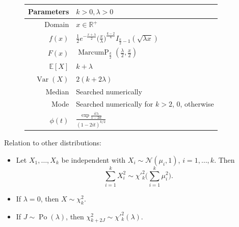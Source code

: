 \documentclass[a4paper,11pt]{article}
\theoremstyle{plain}
\theoremstyle{definition}
\newcommand{\ME}{\mathbb{E}}
\newcommand{\MR}{\mathbb{R}}
\newcommand{\Var}{\operatorname{Var}}
\begin{document}
\begin{figure}[!htb]
\begin{minipage}{0.4\textwidth}
\begin{tabular}{| r | l |}
			\hline
			Parameters & $k > 0, \lambda > 0$ \\
			\hline
			Domain & $x \in \MR^+$  \\
			\hline
			$f(x)$ & $ \frac{1}{2} e^{-\frac{x+\lambda}{2}}  \Big( \frac{x}{\lambda} \Big)^{\frac{k-2}{4}} I_{\frac{k}{2}-1}(\sqrt{\lambda x})   $ \\
			\hline
			$F(x)$ & $\operatorname{MarcumP}_{\frac{k}{2}}(\frac{\lambda}{2}, \frac{x}{2}) $\\
			\hline
			$\ME[X]$ & $ k + \lambda$ \\
			\hline
			$\Var(X)$ & $2(k+2\lambda)$ \\
			\hline
			Median & Searched numerically\\
			\hline
			Mode & \pbox{\linewidth}{Searched numerically for $k > 2$, \\ $0$, otherwise}  \\
			\hline
			$\phi(t)$ & $ \frac{\exp{\frac{it\lambda}{1-2it}}}{(1-2it)^{k/2}}$ \\
			\hline
		\end{tabular}
	\end{minipage}
    \end{figure}
    Relation to other distributions: 
    \begin{itemize}
    	\item Let $X_1, \dots, X_k$ be independent with $X_i \sim \mathcal{N}(\mu_i, 1)$, $i = 1, \dots, k$. Then
    	\[
    	\sum_{i=1}^{k}X_i^2 \sim \chi'^2_k\big(\sum_{i=1}^{k}\mu_i^2\big).
    	\]
    	\item If $\lambda = 0$, then $X \sim \chi^2_k$.
    	\item If $J \sim \operatorname{Po}(\lambda)$, then $\chi^2_{k+2J} \sim \chi'^2_k(\lambda)$.
    \end{itemize}
    

\pagebreak
\end{document}

